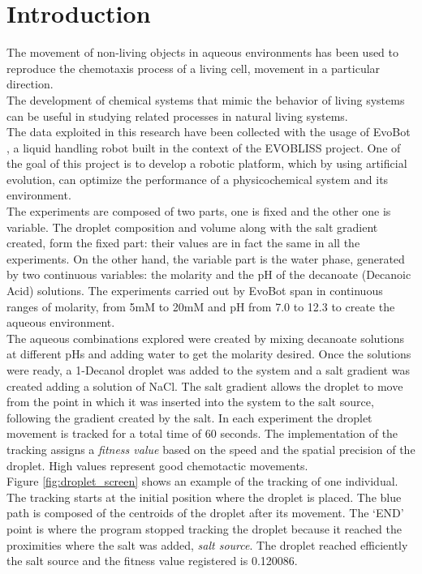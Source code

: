 \documentclass[a4paper]{article}
\begin{document}
\section{Introduction}
The movement of non-living objects in aqueous environments has been used to reproduce the chemotaxis process of a living cell, movement in a particular direction. \cite{ikea} 
\\The development of chemical systems that mimic the behavior of living systems can be useful in studying related processes in natural living systems.
\\The data exploited in this research have been collected with the usage of EvoBot \cite{evobot}, a liquid handling robot built in the context of the EVOBLISS \cite{evobliss} project. One of the goal of this project is to develop a robotic platform, which by using artificial evolution, can optimize the performance of a physicochemical system and its environment.
\\The experiments are composed of two parts, one is fixed and the other one is variable. The droplet composition and volume along with the salt gradient created, form the fixed part: their values are in fact the same in all the experiments. On the other hand, the variable part is the water phase, generated by two continuous variables: the molarity and the pH of the decanoate (Decanoic Acid) solutions. The experiments carried out by EvoBot \cite{evobot} span in continuous ranges of molarity, from 5mM to 20mM and pH from 7.0 to 12.3 to create the aqueous environment.
\\The aqueous combinations explored were created by mixing decanoate solutions at different pHs and adding water to get the molarity desired. Once the solutions were ready, a 1-Decanol droplet was added to the system and a salt gradient was created adding a solution of NaCl.
The salt gradient allows the droplet to move from the point in which it was inserted into the system to the salt source, following the gradient created by the salt.
In each experiment the droplet movement is tracked for a total time of 60 seconds. The implementation of the tracking assigns a \textit{fitness value} based on the speed and the spatial precision of the droplet. High values represent good chemotactic movements.
\\ Figure \ref{fig:droplet_screen} shows an example of the tracking of one individual. The tracking starts at the initial position where the droplet is placed. The blue path is composed of the centroids of the droplet after its movement. 
\newpage
The ‘END’ point is where the program stopped tracking the droplet because it reached the proximities where the salt was added, \textit{salt source}. The droplet reached efficiently the salt source and the fitness value registered is 0.120086. 
\end{document}
